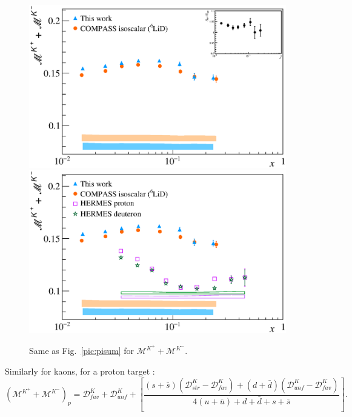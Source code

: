 \begin{figure}[!h]
  \centering
	\includegraphics[scale=0.5]{./gfx/Mult_k_sum_noH.eps}
  \includegraphics[scale=0.5]{./gfx/Mult_k_sum.eps}
  \caption{Same as Fig.~\ref{pic:pisum} for $\mathscr{M}^{K^+}+\mathscr{M}^{K^-}$.}
  \label{pic:ksum}
\end{figure}

Similarly for kaons, for a proton target \cite{MarcinNic}:
%
\begin{equation}
  \left( \mathscr{M}^{K^+}+\mathscr{M}^{K^-} \right)_p = \mathscr{D}^K_{fav}+\mathscr{D}^K_{unf}+\left[\frac{(s+\bar{s})\left( \mathscr{D}^K_{str}-\mathscr{D}^K_{fav} \right) + (d+\bar{d})\left( \mathscr{D}^K_{unf}-\mathscr{D}^K_{fav} \right)}{4(u+\bar{u}) + d + \bar{d} + s + \bar{s}} \right].
\end{equation}
%

